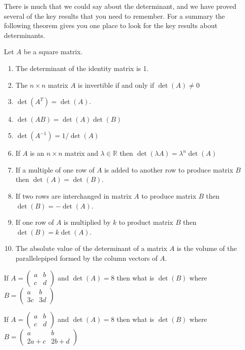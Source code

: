 There is much that we could say about the determinant, and we have proved several of the
key results that you need to remember.  For a summary the following theorem gives you one
place to look for the key results about determinants.
\begin{thm}\label{thm:determinant_summary}
    Let $A$ be a square matrix.
    \begin{enumerate}
        \item The determinant of the identity matrix is 1.
        \item The $n \times n$ matrix $A$ is invertible if and only if $\det(A) \ne 0$
        \item $\det(A^T) = \det(A)$.
        \item $\det(AB) = \det(A) \det(B)$
        \item $\det(A^{-1}) = 1/\det(A)$
        \item If $A$ is an $n \times n$ matrix and $\lambda \in \mathbb{R}$ then $\det(\lambda A) = \lambda^n \det(A)$ 
        \item If a multiple of one row of $A$ is added to another row to produce matrix
            $B$ then $\det(A) = \det(B)$.
        \item If two rows are interchanged in matrix $A$ to produce matrix $B$ then
            $\det(B) = -\det(A)$.
        \item If one row of $A$ is multiplied by $k$ to product matrix $B$ then $\det(B) =
            k \det(A)$.
        \item The absolute value of the determinant of a matrix $A$ is the volume of the parallelepiped
            formed by the column vectors of $A$.
    \end{enumerate}
\end{thm}


\begin{problem}
    If $A = \begin{pmatrix} a & b \\ c & d \end{pmatrix}$ and $\det(A) = 8$ then what is
        $\det(B)$ where $B = \begin{pmatrix} a & b \\ 3c & 3d \end{pmatrix}$
\end{problem}


\begin{problem}
    If $A = \begin{pmatrix} a & b \\ c & d \end{pmatrix}$ and $\det(A) = 8$ then what is
    $\det(B)$ where $B = \begin{pmatrix} a & b \\ 2a+c & 2b + d \end{pmatrix}$    
\end{problem}


